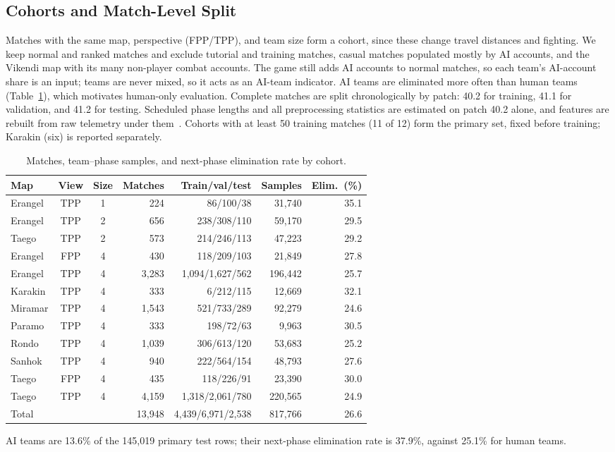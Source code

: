 \documentclass[sigconf,anonymous]{acmart}
\begin{document}
\subsection{Cohorts and Match-Level Split}
\label{sec:method:cohort}
Matches with the same map, perspective (FPP/TPP), and team size form a cohort, since these change travel distances and fighting. We keep normal and ranked matches and exclude tutorial and training matches, casual matches populated mostly by AI accounts, and the Vikendi map with its many non-player combat accounts. The game still adds AI accounts to normal matches, so each team's AI-account share is an input; teams are never mixed, so it acts as an AI-team indicator. AI teams are eliminated more often than human teams (Table~\ref{tab:cohorts}), which motivates human-only evaluation. Complete matches are split chronologically by patch: 40.2 for training, 41.1 for validation, and 41.2 for testing. Scheduled phase lengths and all preprocessing statistics are estimated on patch 40.2 alone, and features are rebuilt from raw telemetry under them~\cite{Kaufman12}. Cohorts with at least 50 training matches (11 of 12) form the primary set, fixed before training; Karakin (six) is reported separately.

\begin{table}[t]
\centering
\caption{Matches, team--phase samples, and next-phase elimination rate by cohort.}
\label{tab:cohorts}
\scriptsize
\setlength{\tabcolsep}{2.7pt}
\begin{tabular}{lccrrrr}
\hline
Map & View & Size & Matches & Train/val/test & Samples & Elim.\ (\%) \\
\hline
Erangel & TPP & 1 & 224 & 86/100/38 & 31,740 & 35.1 \\
Erangel & TPP & 2 & 656 & 238/308/110 & 59,170 & 29.5 \\
Taego & TPP & 2 & 573 & 214/246/113 & 47,223 & 29.2 \\
Erangel & FPP & 4 & 430 & 118/209/103 & 21,849 & 27.8 \\
Erangel & TPP & 4 & 3,283 & 1,094/1,627/562 & 196,442 & 25.7 \\
Karakin & TPP & 4 & 333 & 6/212/115 & 12,669 & 32.1 \\
Miramar & TPP & 4 & 1,543 & 521/733/289 & 92,279 & 24.6 \\
Paramo & TPP & 4 & 333 & 198/72/63 & 9,963 & 30.5 \\
Rondo & TPP & 4 & 1,039 & 306/613/120 & 53,683 & 25.2 \\
Sanhok & TPP & 4 & 940 & 222/564/154 & 48,793 & 27.6 \\
Taego & FPP & 4 & 435 & 118/226/91 & 23,390 & 30.0 \\
Taego & TPP & 4 & 4,159 & 1,318/2,061/780 & 220,565 & 24.9 \\
\hline
Total & & & 13,948 & 4,439/6,971/2,538 & 817,766 & 26.6 \\
\hline
\end{tabular}
\smallskip
\parbox{\columnwidth}{\scriptsize AI teams are 13.6\% of the 145,019 primary test rows; their next-phase elimination rate is 37.9\%, against 25.1\% for human teams.}
\end{table}
\end{document}
